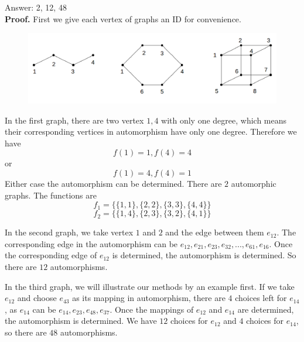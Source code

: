 \par
\par
\par
Answer: 2, 12, 48\\
\textbf{Proof.} First we give each vertex of graphs an ID for convenience.
\begin{figure}[hpbt]
\begin{center}
\includegraphics[width=0.8 \textwidth]{ex6-1_img.png}
\end{center}
\end{figure}

In the first graph, there are two vertex $1,4$ with only one degree, which means their corresponding vertices in automorphism have only one degree. Therefore we have 
$$f(1)=1, f(4)=4$$ 
or 
$$f(1)=4, f(4)=1$$
Either case the automorphism can be determined. There are $2$ automorphic graphs. The functions are
$$f_1=\{\{1,1\}, \{2,2\}, \{3,3\}, \{4,4\}\}$$ 
$$f_2=\{\{1,4\}, \{2,3\}, \{3,2\}, \{4,1\}\}$$
\par In the second graph, we take vertex $1$ and $2$ and the edge between them $e_{12}$. The corresponding edge in the automorphism can be $e_{12},e_{21}, e_{23}, e_{32},..., e_{61},e_{16}$. Once the corresponding edge of $e_{12}$ is determined, the automorphism is determined. So there are  $12$ automorphisms.

\par In the third graph, we will illustrate our methods by an example first. If we take $e_{12}$ and choose $e_{43}$ as its mapping in automorphism, there are $4$ choices left for $e_{14}$, as $e_{14}$ can be $e_{14}, e_{23}, e_{48}, e_{37}$. Once the mappings of $e_{12}$ and $e_{14}$ are determined, the automorphism is determined. We have $12$ choices for $e_{12}$ and $4$ choices for $e_{14}$, so there are $48$ automorphisms.